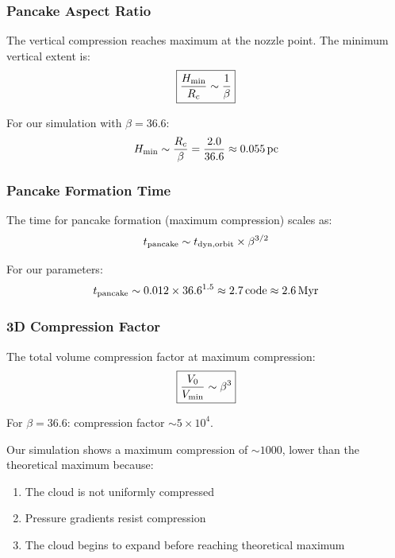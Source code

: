 \documentclass[twocolumn,amsmath,amssymb,prd,superscriptaddress,nofootinbib]{revtex4-2}
\begin{document}
\subsubsection{Pancake Aspect Ratio}

The vertical compression reaches maximum at the nozzle point. The minimum vertical extent is:
\begin{equation}
    \boxed{\frac{H_{\rm min}}{R_c} \sim \frac{1}{\beta}}
    \label{eq:H_min}
\end{equation}

For our simulation with $\beta = 36.6$:
\begin{equation}
    H_{\rm min} \sim \frac{R_c}{\beta} = \frac{2.0}{36.6} \approx 0.055\,{\rm pc}
\end{equation}

\subsubsection{Pancake Formation Time}

The time for pancake formation (maximum compression) scales as:
\begin{equation}
    t_{\rm pancake} \sim t_{\rm dyn,orbit} \times \beta^{3/2}
    \label{eq:t_pancake}
\end{equation}

For our parameters:
\begin{equation}
    t_{\rm pancake} \sim 0.012 \times 36.6^{1.5} \approx 2.7\,{\rm code} \approx 2.6\,{\rm Myr}
\end{equation}

\subsubsection{3D Compression Factor}

The total volume compression factor at maximum compression:
\begin{equation}
    \boxed{\frac{V_0}{V_{\rm min}} \sim \beta^3}
    \label{eq:compression}
\end{equation}

For $\beta = 36.6$: compression factor $\sim 5 \times 10^4$.

Our simulation shows a maximum compression of $\sim 1000$, lower than the theoretical maximum because:
\begin{enumerate}
    \item The cloud is not uniformly compressed
    \item Pressure gradients resist compression
    \item The cloud begins to expand before reaching theoretical maximum
\end{enumerate}
\end{document}
